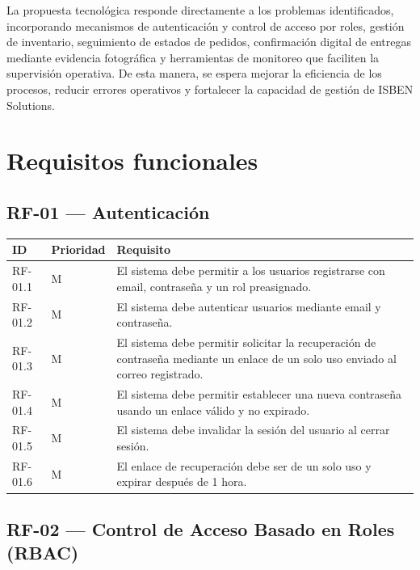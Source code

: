 \documentclass[12pt,a4paper]{report}
\begin{document}
La propuesta tecnológica responde directamente a los problemas identificados, incorporando mecanismos de autenticación y control de acceso por roles, gestión de inventario, seguimiento de estados de pedidos, confirmación digital de entregas mediante evidencia fotográfica y herramientas de monitoreo que faciliten la supervisión operativa. De esta manera, se espera mejorar la eficiencia de los procesos, reducir errores operativos y fortalecer la capacidad de gestión de ISBEN Solutions.



\section{Requisitos funcionales}
\subsection{RF-01 --- Autenticación}

\begin{longtable}{|p{2cm}|p{2cm}|p{10cm}|}
\hline
\textbf{ID} & \textbf{Prioridad} & \textbf{Requisito} \\ \hline
RF-01.1 & M & El sistema debe permitir a los usuarios registrarse con email, contraseña y un rol preasignado. \\ \hline
RF-01.2 & M & El sistema debe autenticar usuarios mediante email y contraseña. \\ \hline
RF-01.3 & M & El sistema debe permitir solicitar la recuperación de contraseña mediante un enlace de un solo uso enviado al correo registrado. \\ \hline
RF-01.4 & M & El sistema debe permitir establecer una nueva contraseña usando un enlace válido y no expirado. \\ \hline
RF-01.5 & M & El sistema debe invalidar la sesión del usuario al cerrar sesión. \\ \hline
RF-01.6 & M & El enlace de recuperación debe ser de un solo uso y expirar después de 1 hora. \\ \hline
\end{longtable}

\subsection{RF-02 --- Control de Acceso Basado en Roles (RBAC)}
\end{document}
